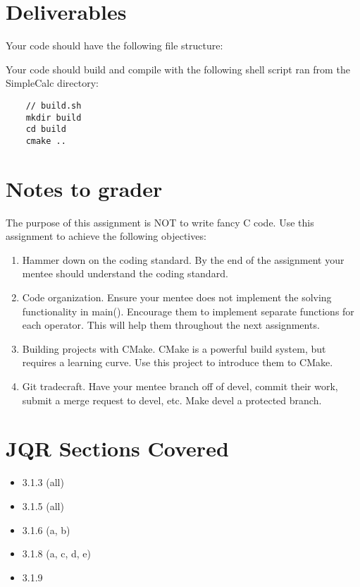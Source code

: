 \documentclass[letterpaper,12pt]{article}
\begin{document}
	\section{Deliverables}
	Your code should have the following file structure:
	\hfill

	Your code should build and compile with the following shell script ran from the SimpleCalc directory:

	\begin{lstlisting}
	// build.sh
	mkdir build
	cd build
	cmake ..
	\end{lstlisting}
	
	
	\section{Notes to grader}
	The purpose of this assignment is NOT to write fancy C code. Use this assignment to achieve the following objectives:
	\begin{enumerate}
		\item Hammer down on the coding standard. By the end of the assignment your mentee should understand the coding standard.
		\item Code organization. Ensure your mentee does not implement the solving functionality in main(). Encourage them to implement separate functions for each operator. This will help them throughout the next assignments.
		\item Building projects with CMake. CMake is a powerful build system, but requires a learning curve. Use this project to introduce them to CMake.
		\item Git tradecraft. Have your mentee branch off of devel, commit their work, submit a merge request to devel, etc. Make devel a protected branch.
	\end{enumerate}

	\section{JQR Sections Covered}
	\begin{itemize}
		\item 3.1.3 (all)
		\item 3.1.5 (all)
		\item 3.1.6 (a, b)
		\item 3.1.8 (a, c, d, e) 
		\item 3.1.9 
	\end{itemize}
	
	
\end{document}
